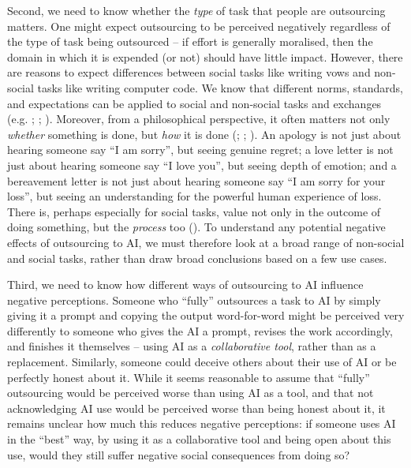 \documentclass[
  man,
  floatsintext,
  longtable,
  nolmodern,
  notxfonts,
  notimes,
  colorlinks=true,linkcolor=blue,citecolor=blue,urlcolor=blue]{apa7}
\begin{document}
Second, we need to know whether the \emph{type} of task that people are
outsourcing matters. One might expect outsourcing to be perceived
negatively regardless of the type of task being outsourced -- if effort
is generally moralised, then the domain in which it is expended (or not)
should have little impact. However, there are reasons to expect
differences between social tasks like writing vows and non-social tasks
like writing computer code. We know that different norms, standards, and
expectations can be applied to social and non-social tasks and exchanges
(e.g. ;
; ). Moreover, from a philosophical perspective, it often matters not
only \emph{whether} something is done, but \emph{how} it is done
(;
;
). An apology is not just about
hearing someone say ``I am sorry'', but seeing genuine regret; a love
letter is not just about hearing someone say ``I love you'', but seeing
depth of emotion; and a bereavement letter is not just about hearing
someone say ``I am sorry for your loss'', but seeing an understanding
for the powerful human experience of loss. There is, perhaps especially
for social tasks, value not only in the outcome of doing something, but
the \emph{process} too (). To
understand any potential negative effects of outsourcing to AI, we must
therefore look at a broad range of non-social and social tasks, rather
than draw broad conclusions based on a few use cases.

Third, we need to know how different ways of outsourcing to AI influence
negative perceptions. Someone who ``fully'' outsources a task to AI by
simply giving it a prompt and copying the output word-for-word might be
perceived very differently to someone who gives the AI a prompt, revises
the work accordingly, and finishes it themselves -- using AI as a
\emph{collaborative tool}, rather than as a replacement. Similarly,
someone could deceive others about their use of AI or be perfectly
honest about it. While it seems reasonable to assume that ``fully''
outsourcing would be perceived worse than using AI as a tool, and that
not acknowledging AI use would be perceived worse than being honest
about it, it remains unclear how much this reduces negative perceptions:
if someone uses AI in the ``best'' way, by using it as a collaborative
tool and being open about this use, would they still suffer negative
social consequences from doing so?
\end{document}
